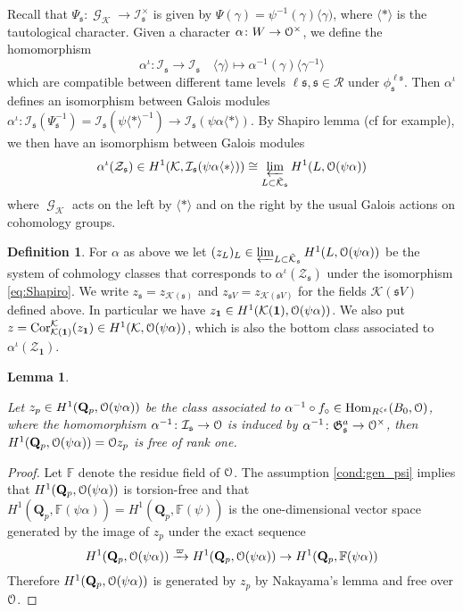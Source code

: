 \documentclass[leqno]{amsart}
\newtheorem{lem}[thm]{Lemma}
\theoremstyle{definition}
\newtheorem{defn}[thm]{Definition}
\theoremstyle{remark}
\newcommand{\id}{\mathbf{1}}
\newcommand{\eo}{\EuScript{O}}
\newcommand{\fF}{\mathbb{F}} %
\newcommand{\Qp}{\mathbf{Q}_p}
\DeclareMathOperator{\Hom}{Hom}
\DeclareMathOperator{\Cor}{Cor}
\DeclareMathOperator{\Gal}{\mathcal{G}}
\newcommand{\fs}{\mathfrak{s}}
\newcommand{\K}{{\mathcal{K}}} %
\newcommand{\fG}{\mathfrak{G}}
\newcommand{\I}{\mathcal{I}} %
\begin{document}
Recall that $\Psi_\fs\colon \Gal_\K\to \I_\fs^\times$
is given by $\Psi(\gamma)=\psi^{-1}(\gamma)\langle \gamma)$,
where $\langle*\rangle$ is the tautological character.
Given a character $\alpha\colon W\to \eo^\times$,
we define the homomorphism 
\[
    \alpha^\iota\colon \I_\fs\to \I_\fs\quad
    \langle\gamma\rangle\mapsto \alpha^{-1}(\gamma)
    \langle \gamma^{-1}\rangle
\]
which are compatible between different tame levels 
$\ell\fs, \fs\in \mathcal{R}$ under $\phi^{\ell\fs}_\fs$.
Then $\alpha^\iota$ defines an isomorphism between Galois modules
$\alpha^\iota\colon \I_\fs(\Psi_\fs^{-1})=
\I_\fs(\psi\langle*\rangle^{-1})
\to \I_\fs(\psi\alpha\langle*\rangle)$.
By Shapiro lemma
(cf \cite[Lem 5.8]{Schneider2016} for example), 
we then have an isomorphism between Galois modules
\begin{equation}\label{eq:Shapiro}
    \alpha^\iota(\mathcal{Z}_\fs) \in 
    H^1(\K, \I_\fs(\psi\alpha\langle*\rangle))\cong 
    \varprojlim_{L\subset \tilde{\K}_\fs}
    H^1(L, \eo(\psi\alpha))
\end{equation}
where $\Gal_\K$ acts on the left by $\langle*\rangle$
and on the right by the usual 
Galois actions on cohomology groups.

\begin{defn}

For $\alpha$ as above we let  
$(z_L)_L\in \varprojlim_{L\subset \tilde{\K}_\fs}
H^1(L, \eo(\psi\alpha))$
be the system of cohmology classes that corresponds to 
$\alpha^\iota(\mathcal{Z}_\fs)$
under the isomorphism \eqref{eq:Shapiro}.
We write $z_\fs=z_{\K(\fs)}$ and
$z_{\fs V}=z_{\K(\fs V)}$ 
for the fields $\K(\fs V)$ defined above.
In particular we have  
$z_{\id}\in H^1(\K(\id), \eo(\psi\alpha))$.
We also put 
$z=\Cor_{\K(\id)}^{\K}(z_\id)\in H^1(\K, \eo(\psi\alpha))$,
which is also the bottom class associated to 
$\alpha^\iota(\mathcal{Z}_\id)$.

\end{defn}



\begin{lem}\label{lem:classp}

Let $z_p\in H^1(\Qp, \eo(\psi\alpha))$
be the class associated to 
$\alpha^{-1}\circ f_\circ\in \Hom_{R^{\zeta\epsilon}}(B_0, \eo)$,
where the homomorphism 
$\alpha^{-1}\colon \I_\fs\to \eo$ is induced by 
$\alpha^{-1}\colon \fG_\fs^a\to \eo^\times$, 
then $H^1(\Qp, \eo(\psi\alpha))=\eo z_p$
is free of rank one.
\end{lem}
\begin{proof}

Let $\fF$ denote the residue field of $\eo$.
The assumption \eqref{cond:gen_psi}
implies that 
$H^1(\Qp, \eo(\psi\alpha))$ is torsion-free and that
$H^1(\Qp, \fF(\psi\alpha))=H^1(\Qp, \fF(\psi))$
is the one-dimensional vector space generated by 
the image of $z_p$ under the exact sequence
\[
    H^1(\Qp, \eo(\psi\alpha))\xrightarrow{\varpi}
    H^1(\Qp, \eo(\psi\alpha))\to
    H^1(\Qp, \fF(\psi\alpha))
\]
Therefore $H^1(\Qp, \eo(\psi\alpha))$
is generated by $z_p$ by Nakayama's lemma
and free over $\eo$.

\end{proof}
\end{document}
